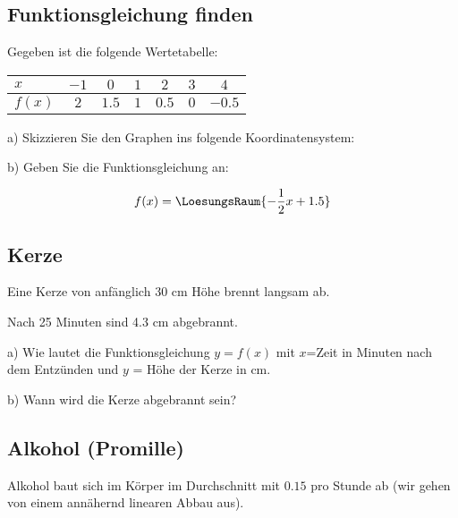 
\subsection{Funktionsgleichung finden}
Gegeben ist die folgende Wertetabelle:

\begin{tabular}{l|c|c|c|c|c|c|}
$x$    & $-1$ & $0$   & $1$ & $2$   & $3$ & $4$ \\\hline
$f(x)$ & $2$  & $1.5$ & $1$ & $0.5$ & $0$ & $-0.5$ \\
\end{tabular}

a) Skizzieren Sie den Graphen ins folgende Koordinatensystem:


b) Geben Sie die Funktionsgleichung an:

$$f(x) = \LoesungsRaum{-\frac12x+1.5}$$
\TNTeop{}

\subsection{Kerze}
Eine Kerze von anfänglich 30 cm Höhe brennt langsam ab.

Nach 25 Minuten sind 4.3 cm abgebrannt.

a) Wie lautet die Funktionsgleichung $y=f(x)$ mit $x$=Zeit in Minuten
nach dem Entzünden und $y$ = Höhe der Kerze in cm.

b) Wann wird die Kerze abgebrannt sein?

\subsection{Alkohol (Promille)}
Alkohol baut sich im Körper im Durchschnitt mit
$0.15$\textperthousand{} pro Stunde ab (wir gehen von einem annähernd
linearen Abbau aus).

